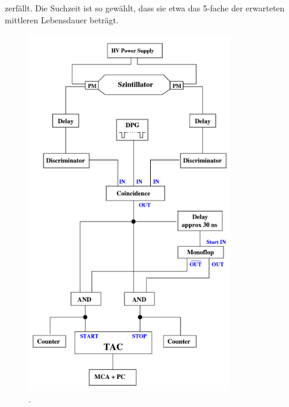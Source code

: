 zerfällt. Die Suchzeit ist so gewählt, dass sie etwa das 5-fache der erwarteten mittleren Lebensdauer beträgt.
\begin{figure}
    \centering
    \includegraphics[width = 0.8\textwidth]{pics/Aufbau.png}
    \caption{. \cite{v01}}
    \label{fig:Aufbau}
\end{figure}